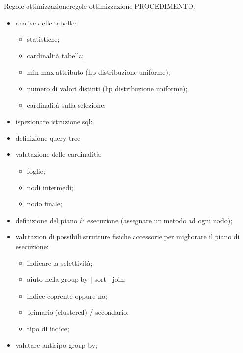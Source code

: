 \documentclass[12pt]{article}
\begin{document}
\begin{theorem}{Regole ottimizzazione}{regole-ottimizzazione}
    PROCEDIMENTO:
    \begin{itemize}
        \item analise delle tabelle:
            \begin{itemize}
                \item statistiche;
                \item cardinalit\`a tabella;
                \item min-max attributo (hp distribuzione uniforme);
                \item numero di valori distinti (hp distribuzione uniforme);
                \item cardinalit\`a sulla selezione;
            \end{itemize}
        \item ispezionare istruzione sql:
        \item definizione query tree;
        \item valutazione delle cardinalit\`a:
            \begin{itemize}
                \item foglie;
                \item nodi intermedi;
                \item nodo finale;
            \end{itemize}
        \item definizione del piano di esecuzione (assegnare un metodo ad ogni nodo);
        \item valutazion di possibili strutture fisiche accessorie per migliorare il piano di esecuzione:
            \begin{itemize}
                \item indicare la selettivit\`a;
                \item aiuto nella group by | sort | join;
                \item indice coprente oppure no;
                \item primario (clustered) / secondario;
                \item tipo di indice;
            \end{itemize}
        \item valutare anticipo group by;
    \end{itemize}
\end{theorem}
\end{document}
